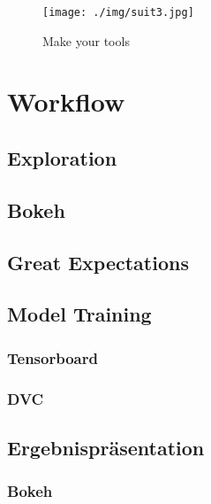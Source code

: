 \documentclass[11pt]{article}
\makeatletter
\def\maxwidth{\ifdim\Gin@nat@width>\linewidth\linewidth
    \else\Gin@nat@width\fi}
\let\Oldincludegraphics\includegraphics
\renewcommand{\includegraphics}[1]{\Oldincludegraphics[width=.8\maxwidth]{#1}}
\makeatother
\begin{document}
\begin{figure}
\centering
\texttt{[image: ./img/suit3.jpg]}
\caption{Make your tools}
\end{figure}

    \hypertarget{workflow}{%
\section{Workflow}\label{workflow}}

    \hypertarget{exploration}{%
\subsection{Exploration}\label{exploration}}

    \hypertarget{bokeh}{%
\subsection{Bokeh}\label{bokeh}}

    \hypertarget{great-expectations}{%
\subsection{Great Expectations}\label{great-expectations}}

    \hypertarget{model-training}{%
\subsection{Model Training}\label{model-training}}

    \hypertarget{tensorboard}{%
\subsubsection{Tensorboard}\label{tensorboard}}

    \hypertarget{dvc}{%
\subsubsection{DVC}\label{dvc}}

    \hypertarget{ergebnispruxe4sentation}{%
\subsection{Ergebnispräsentation}\label{ergebnispruxe4sentation}}

    \hypertarget{bokeh}{%
\subsubsection{Bokeh}\label{bokeh}}
\end{document}
